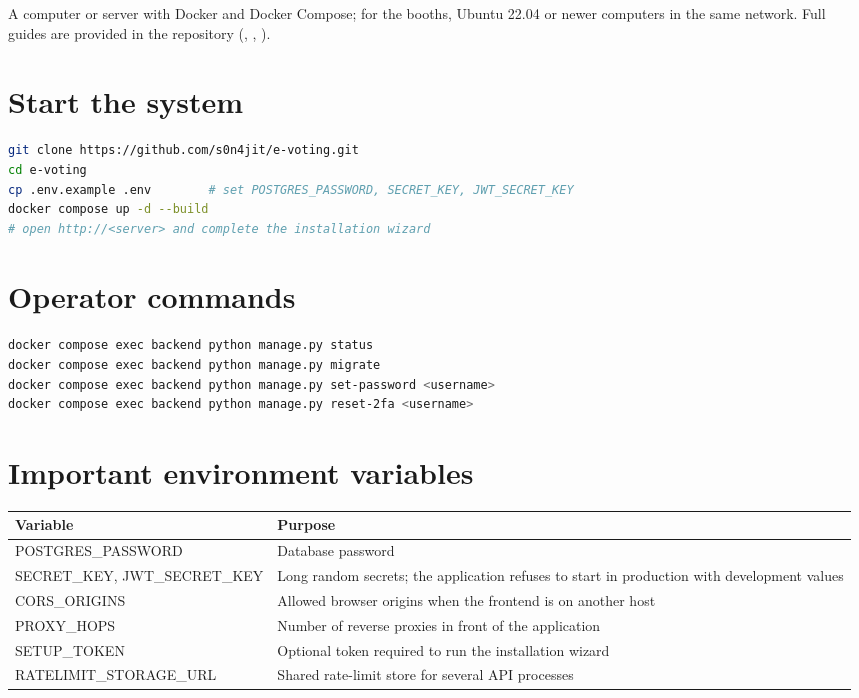 A computer or server with Docker and Docker Compose; for the booths, Ubuntu 22.04 or newer computers in the same network. Full guides are provided in the repository (, , ).

\section{Start the system}

\begin{lstlisting}[language=bash]
git clone https://github.com/s0n4jit/e-voting.git
cd e-voting
cp .env.example .env        # set POSTGRES_PASSWORD, SECRET_KEY, JWT_SECRET_KEY
docker compose up -d --build
# open http://<server> and complete the installation wizard
\end{lstlisting}

\section{Operator commands}

\begin{lstlisting}[language=bash]
docker compose exec backend python manage.py status
docker compose exec backend python manage.py migrate
docker compose exec backend python manage.py set-password <username>
docker compose exec backend python manage.py reset-2fa <username>
\end{lstlisting}

\section{Important environment variables}

\begin{center}
\small
\begin{tabularx}{\linewidth}{@{}>{\ttfamily}l X@{}}
\toprule
\textrm{\textbf{Variable}} & \textbf{Purpose} \\
\midrule
POSTGRES\_PASSWORD & Database password \\
SECRET\_KEY, JWT\_SECRET\_KEY & Long random secrets; the application refuses to start in production with development values \\
CORS\_ORIGINS & Allowed browser origins when the frontend is on another host \\
PROXY\_HOPS & Number of reverse proxies in front of the application \\
SETUP\_TOKEN & Optional token required to run the installation wizard \\
RATELIMIT\_STORAGE\_URL & Shared rate-limit store for several API processes \\
\bottomrule
\end{tabularx}
\end{center}

